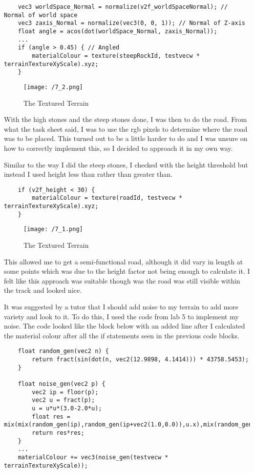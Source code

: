 \documentclass[11pt, oneside, a4paper]{article}
\begin{document}
\begin{lstlisting}
    vec3 worldSpace_Normal = normalize(v2f_worldSpaceNormal); // Normal of world space
    vec3 zaxis_Normal = normalize(vec3(0, 0, 1)); // Normal of Z-axis
    float angle = acos(dot(worldSpace_Normal, zaxis_Normal));
    ...
    if (angle > 0.45) { // Angled
        materialColour = texture(steepRockId, testvecw * terrainTextureXyScale).xyz;
    }
\end{lstlisting}

\newpage
\begin{figure}[!ht]
	\centerline{\texttt{[image: /7\_2.png]}}
	\caption{The Textured Terrain}
	\label{fig:figure5}
\end{figure}

With the high stones and the steep stones done, I was then to do the road. From what the task sheet said, I was to use the rgb pixels to determine where the road was to be placed. This turned out to be a little harder to do and I was unsure on how to correctly implement this, so I decided to approach it in my own way.

Similar to the way I did the steep stones, I checked with the height threshold but instead I used height less than rather than greater than. 

\begin{lstlisting}
    if (v2f_height < 30) {
        materialColour = texture(roadId, testvecw * terrainTextureXyScale).xyz;
    } 
\end{lstlisting}

\begin{figure}[!ht]
	\centerline{\texttt{[image: /7\_1.png]}}
	\caption{The Textured Terrain}
	\label{fig:figure9}
\end{figure}
This allowed me to get a semi-functional road, although it did vary in length at some points which was due to the height factor not being enough to calculate it. I felt like this approach was suitable though was the road was still visible within the track and looked nice.

\newpage

It was suggested by a tutor that I should add noise to my terrain to add more variety and look to it. To do this, I used the code from lab 5 to implement my noise. The code looked like the block below with an added line after I calculated the material colour after all the if statements seen in the previous code blocks.

\begin{lstlisting}
    float random_gen(vec2 n) { 
        return fract(sin(dot(n, vec2(12.9898, 4.1414))) * 43758.5453);
    }
    
    float noise_gen(vec2 p) {
        vec2 ip = floor(p);
        vec2 u = fract(p);
        u = u*u*(3.0-2.0*u);
        float res = mix(mix(random_gen(ip),random_gen(ip+vec2(1.0,0.0)),u.x),mix(random_gen(ip+vec2(0.0,1.0)),random_gen(ip+vec2(1.0,1.0)),u.x),u.y);
        return res*res;
    }
    ...
    materialColour += vec3(noise_gen(testvecw * terrainTextureXyScale));
\end{lstlisting}
\end{document}
